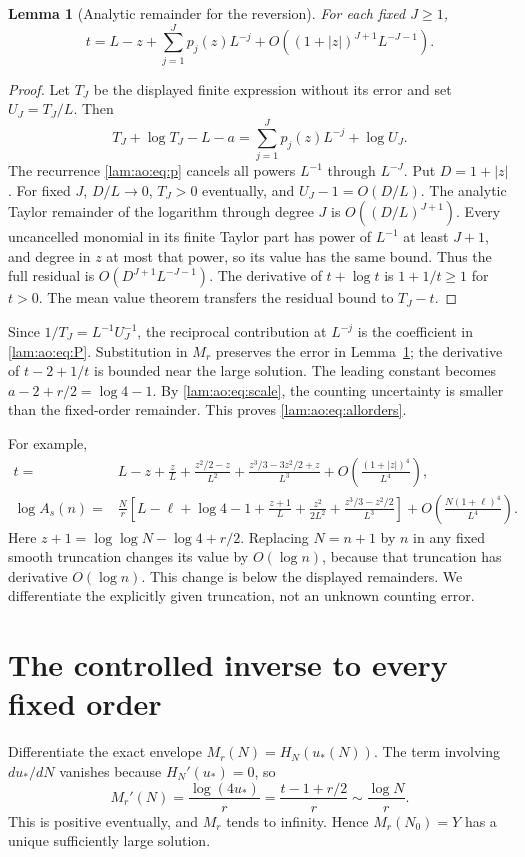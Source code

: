 \documentclass[11pt,a4paper]{article}
\numberwithin{equation}{section}
\newtheorem{lemma}[theorem]{Lemma}
\theoremstyle{remark}
\begin{document}
\begin{lemma}[Analytic remainder for the reversion]\label{lam:ao:lem:reversion}
For each fixed $J\ge1$,
\begin{equation}\label{lam:ao:eq:texpand}
 t=L-z+\sum_{j=1}^Jp_j(z)L^{-j}
       +O((1+|z|)^{J+1}L^{-J-1}).
\end{equation}
\end{lemma}
\begin{proof}
Let $T_J$ be the displayed finite expression without its error and set $U_J=T_J/L$. Then
\[
 T_J+\log T_J-L-a=\sum_{j=1}^Jp_j(z)L^{-j}+\log U_J.
\]
The recurrence \eqref{lam:ao:eq:p} cancels all powers $L^{-1}$ through $L^{-J}$. Put $D=1+|z|$. For fixed $J$, $D/L\to0$, $T_J>0$ eventually, and $U_J-1=O(D/L)$. The analytic Taylor remainder of the logarithm through degree $J$ is $O((D/L)^{J+1})$. Every uncancelled monomial in its finite Taylor part has power of $L^{-1}$ at least $J+1$, and degree in $z$ at most that power, so its value has the same bound. Thus the full residual is $O(D^{J+1}L^{-J-1})$. The derivative of $t+\log t$ is $1+1/t\ge1$ for $t>0$. The mean value theorem transfers the residual bound to $T_J-t$.
\end{proof}

Since $1/T_J=L^{-1}U_J^{-1}$, the reciprocal contribution at $L^{-j}$ is the coefficient in \eqref{lam:ao:eq:P}. Substitution in $M_r$ preserves the error in Lemma~\ref{lam:ao:lem:reversion}; the derivative of $t-2+1/t$ is bounded near the large solution. The leading constant becomes $a-2+r/2=\log4-1$. By \eqref{lam:ao:eq:scale}, the counting uncertainty is smaller than the fixed-order remainder. This proves \eqref{lam:ao:eq:allorders}.

For example,
\begin{align*}
 t={}&L-z+\frac zL+\frac{z^2/2-z}{L^2}
       +\frac{z^3/3-3z^2/2+z}{L^3}
       +O\!\left(\frac{(1+|z|)^4}{L^4}\right),\\
 \log A_s(n)={}&\frac Nr\left[L-\ell+\log4-1
        +\frac{z+1}L+\frac{z^2}{2L^2}
        +\frac{z^3/3-z^2/2}{L^3}\right]
       +O\!\left(\frac{N(1+\ell)^4}{L^4}\right).
\end{align*}
Here $z+1=\log\log N-\log4+r/2$. Replacing $N=n+1$ by $n$ in any fixed smooth truncation changes its value by $O(\log n)$, because that truncation has derivative $O(\log n)$. This change is below the displayed remainders. We differentiate the explicitly given truncation, not an unknown counting error.

\section{The controlled inverse to every fixed order}\label{lam:ao:sec:inverse}
Differentiate the exact envelope $M_r(N)=H_N(u_*(N))$. The term involving $du_*/dN$ vanishes because $H_N'(u_*)=0$, so
\begin{equation}\label{lam:ao:eq:Mprime}
 M_r'(N)=\frac{\log(4u_*)}r=\frac{t-1+r/2}r\sim\frac{\log N}r.
\end{equation}
This is positive eventually, and $M_r$ tends to infinity. Hence $M_r(N_0)=Y$ has a unique sufficiently large solution.
\end{document}
